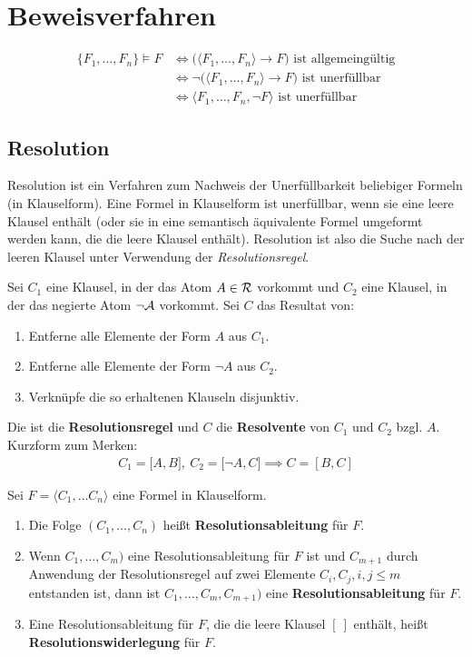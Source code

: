 \section{Beweisverfahren}

\begin{align*}
	\big\lbrace F_1,\ldots,F_n\big\rbrace\models F 
	&\Longleftrightarrow \Big(\big\langle F_1,\ldots,F_n\big\rangle\to F\Big)\text{ ist allgemeingültig}\\
	&\Longleftrightarrow\neg\Big(\big\langle F_1,\ldots,F_n\big\rangle\to F\Big)\text{ ist unerfüllbar}\\
	&\Longleftrightarrow\big\langle F_1,\ldots,F_n,\neg F\big\rangle\text{ ist unerfüllbar}
\end{align*}

\subsection{Resolution}
Resolution ist ein Verfahren zum Nachweis der Unerfüllbarkeit beliebiger Formeln (in Klauselform).
Eine Formel in Klauselform ist unerfüllbar, wenn sie eine leere Klausel enthält (oder sie in eine semantisch äquivalente Formel umgeformt werden kann, die die leere Klausel enthält).
Resolution ist also die Suche nach der leeren Klausel unter Verwendung der \textit{Resolutionsregel}.

\begin{definition}\label{def3.32}
	Sei $C_1$ eine Klausel, in der das Atom $A\in\mathcal{R}$ vorkommt und $C_2$ eine Klausel, in der das negierte Atom $\neg\mathcal{A}$ vorkommt. Sei $C$ das Resultat von:
	\begin{enumerate}
		\item Entferne alle Elemente der Form $A$ aus $C_1$.
		\item Entferne alle Elemente der Form $\neg A$ aus $C_2$.
		\item Verknüpfe die so erhaltenen Klauseln disjunktiv.
	\end{enumerate}
	Die ist die \textbf{Resolutionsregel} und $C$ die \textbf{Resolvente} von $C_1$ und $C_2$ bzgl. $A$. 
	Kurzform zum Merken:
	\begin{align*}
		C_1=\big[ A,B\big],~
		C_2=\big[ \neg A,C\big]\implies C=[ B,C]
	\end{align*}
\end{definition}

\begin{definition}\label{def3.33}
	Sei $F=\langle C_1,\ldots C_n\rangle$ eine Formel in Klauselform.
	\begin{enumerate}
		\item Die Folge $(C_1,\ldots,C_n)$ heißt \textbf{Resolutionsableitung} für $F$.
		\item Wenn $C_1,\ldots,C_m)$ eine Resolutionsableitung für $F$ ist und $C_{m+1}$ durch Anwendung der Resolutionsregel auf zwei Elemente $C_i,C_j,i,j\leq m$ entstanden ist, dann ist $C_1,\ldots,C_m,C_{m+1})$ eine \textbf{Resolutionsableitung} für $F$.
		\item Eine Resolutionsableitung für $F$, die die leere Klausel $[~]$ enthält, heißt \textbf{Resolutionswiderlegung} für $F$.
	\end{enumerate}
\end{definition}

